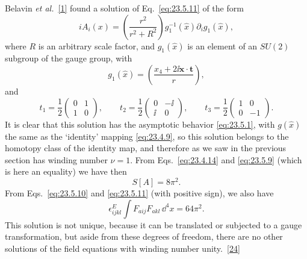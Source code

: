 Belavin \emph{et al.}~\hyperref[ch23-ref-1]{[1]} found a solution of
Eq.~\eqref{eq:23.5.11} of the form
\begin{equation}
iA_i(x)=\left(\frac{r^2}{r^2+R^2}\right)
g_1^{-1}(\widehat x)\partial_i g_1(\widehat x),
\tag{23.5.12}\label{eq:23.5.12}
\end{equation}
where $R$ is an arbitrary scale factor, and $g_1(\widehat x)$ is an
element of an $SU(2)$ subgroup of the gauge group, with
\begin{equation}
g_1(\widehat x)=\left(\frac{x_4+2\ii\mathbf x\cdot\mathbf t}{r}\right),
\tag{23.5.13}\label{eq:23.5.13}
\end{equation}
and
\begin{equation}
t_1=\frac12\begin{pmatrix}0&1\\1&0\end{pmatrix},
\qquad
t_2=\frac12\begin{pmatrix}0&-\ii\\\ii&0\end{pmatrix},
\qquad
t_3=\frac12\begin{pmatrix}1&0\\0&-1\end{pmatrix}.
\tag{23.5.14}\label{eq:23.5.14}
\end{equation}
It is clear that this solution has the asymptotic behavior
\eqref{eq:23.5.1}, with $g(\widehat x)$ the same as the `identity'
mapping \eqref{eq:23.4.9}, so this solution belongs to the homotopy class
of the identity map, and therefore as we saw in the previous section has
winding number $\nu=1$. From Eqs.~\eqref{eq:23.4.14} and
\eqref{eq:23.5.9} (which is here an equality) we have then
\begin{equation}
S[A]=8\pi^2.
\tag{23.5.15}\label{eq:23.5.15}
\end{equation}
From Eqs.~\eqref{eq:23.5.10} and \eqref{eq:23.5.11} (with positive
sign), we also have
\begin{equation}
\epsilon^E_{ijkl}\int F_{a ij}F_{a kl}\,\dd^4x=64\pi^2.
\tag{23.5.16}\label{eq:23.5.16}
\end{equation}
This solution is not unique, because it can be translated or subjected
to a gauge transformation, but aside from these degrees of freedom,
there are no other solutions of the field equations with winding number
unity.~\hyperref[ch23-ref-24]{[24]}

